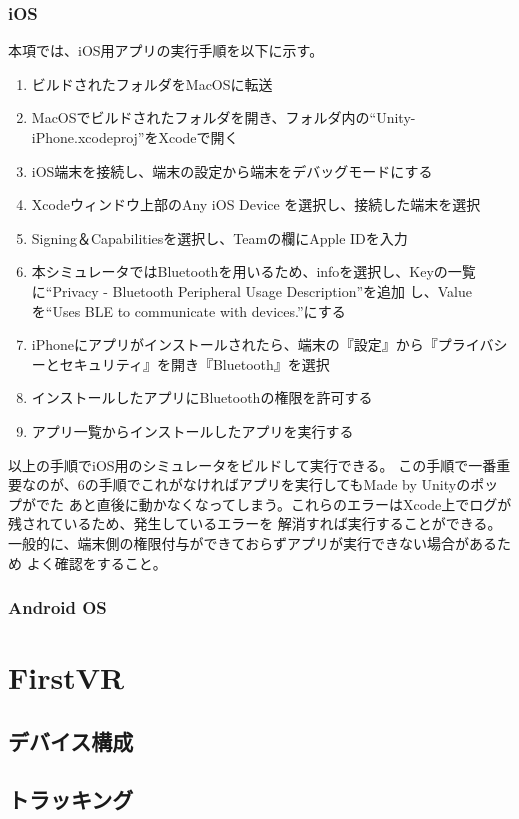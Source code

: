 \documentclass{ltjsreport}
\begin{document}
			\subsubsection{iOS}
				本項では、iOS用アプリの実行手順を以下に示す。
				\begin{enumerate}
					\item ビルドされたフォルダをMacOSに転送
					\item MacOSでビルドされたフォルダを開き、フォルダ内の``Unity-iPhone.xcodeproj''をXcodeで開く
					\item iOS端末を接続し、端末の設定から端末をデバッグモードにする
					\item Xcodeウィンドウ上部のAny iOS Device を選択し、接続した端末を選択
					\item Signing＆Capabilitiesを選択し、Teamの欄にApple IDを入力
					\item 本シミュレータではBluetoothを用いるため、infoを選択し、Keyの一覧に``Privacy - Bluetooth Peripheral Usage Description''を追加
						し、Valueを``Uses BLE to communicate with devices.''にする
					\item iPhoneにアプリがインストールされたら、端末の『設定』から『プライバシーとセキュリティ』を開き『Bluetooth』を選択
					\item インストールしたアプリにBluetoothの権限を許可する
					\item アプリ一覧からインストールしたアプリを実行する
				\end{enumerate}
				以上の手順でiOS用のシミュレータをビルドして実行できる。
				この手順で一番重要なのが、6の手順でこれがなければアプリを実行してもMade by Unityのポップがでた
				あと直後に動かなくなってしまう。これらのエラーはXcode上でログが残されているため、発生しているエラーを
				解消すれば実行することができる。一般的に、端末側の権限付与ができておらずアプリが実行できない場合があるため
				よく確認をすること。
			\subsubsection{Android OS}
	\section{FirstVR}
		\subsection{デバイス構成}
		\subsection{トラッキング}
\end{document}
